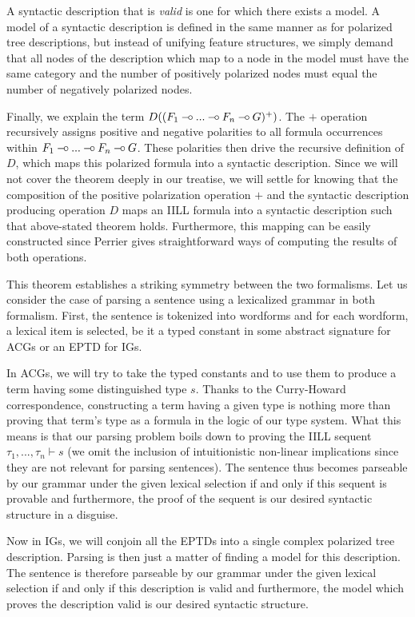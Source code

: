 A syntactic description that is \emph{valid} is one for which there
exists a model. A model of a syntactic description is defined in the
same manner as for polarized tree descriptions, but instead of unifying
feature structures, we simply demand that all nodes of the description
which map to a node in the model must have the same category and the
number of positively polarized nodes must equal the number of negatively
polarized nodes.

Finally, we explain the term $D((F_1 \mathbin{{-}\mkern-3.5mu{\circ}} ... \mathbin{{-}\mkern-3.5mu{\circ}} F_n \mathbin{{-}\mkern-3.5mu{\circ}}
G)^+)$. The $+$ operation recursively assigns positive and negative
polarities to all formula occurrences within $F_1 \mathbin{{-}\mkern-3.5mu{\circ}} ... \mathbin{{-}\mkern-3.5mu{\circ}} F_n
\mathbin{{-}\mkern-3.5mu{\circ}} G$. These polarities then drive the recursive definition of $D$,
which maps this polarized formula into a syntactic description. Since we
will not cover the theorem deeply in our treatise, we will settle for
knowing that the composition of the positive polarization operation $+$
and the syntactic description producing operation $D$ maps an IILL
formula into a syntactic description such that above-stated theorem
holds. Furthermore, this mapping can be easily constructed since Perrier
gives straightforward ways of computing the results of both operations.

This theorem establishes a striking symmetry between the two
formalisms. Let us consider the case of parsing a sentence using a
lexicalized grammar in both formalism. First, the sentence is tokenized
into wordforms and for each wordform, a lexical item is selected, be it
a typed constant in some abstract signature for ACGs or an EPTD for IGs.

In ACGs, we will try to take the typed constants and to use them to
produce a term having some distinguished type $s$. Thanks to the
Curry-Howard correspondence, constructing a term having a given type is
nothing more than proving that term's type as a formula in the logic of
our type system. What this means is that our parsing problem boils down
to proving the IILL sequent $\tau_1, ..., \tau_n \vdash s$ (we omit the
inclusion of intuitionistic non-linear implications since they are not
relevant for parsing sentences). The sentence thus becomes parseable by
our grammar under the given lexical selection if and only if this
sequent is provable and furthermore, the proof of the sequent is our
desired syntactic structure in a disguise.

Now in IGs, we will conjoin all the EPTDs into a single complex
polarized tree description. Parsing is then just a matter of finding a
model for this description. The sentence is therefore parseable by our
grammar under the given lexical selection if and only if this
description is valid and furthermore, the model which proves the
description valid is our desired syntactic structure.

